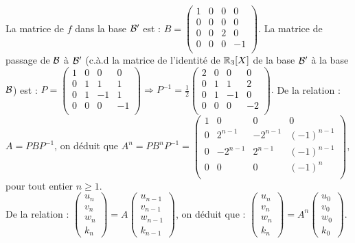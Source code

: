 \begin{question}
\begin{explanations}
\vskip0mm
La matrice de $f$ dans la base ${\cal B}'$ est :
$B= \left(\begin{array}{rccc}
1&0&0&0\\
0&0&0&0\\ 
0&0&2&0\\
0&0&0&-1\\
\end{array}\right)$.
\vskip0mm
La matrice de passage de  ${\cal B}$ à   ${\cal B}'$ (c.à.d la matrice de l'identité de $\mathbb{R}_3[X]$ de 
la base ${\cal B}'$ à la base ${\cal B}$) 
est : $P= \left(\begin{array}{rccc} 1&0&0&0\\
0&1&1&1\\ 
0&1&-1&1\\ 0&0&0&-1\\
\end{array}\right)\Rightarrow \displaystyle P^{-1}= \frac{1}{2}\left(\begin{array}{rccc}
2&0&0&0\\
0&1&1&2\\ 
0&1&-1&0\\
0&0&0&-2\\
\end{array}\right).$ 
\vskip0mm
De la relation : $A=PBP^{-1}$, on déduit que 
$A^n= PB^nP^{-1}=\left(\begin{array}{rccc}
1&0&0&0\\
0 &2^{n-1}&-2^{n-1}&(-1)^{n-1}\\ 
0 &-2^{n-1}&2^{n-1}&(-1)^{n-1}\\ 
0 &0&0&(-1)^n\\ 
\end{array}\right)$, pour tout entier $n\ge 1$.\\
De la relation : $\left(\begin{array}{r}u_n\\v_n\\ w_n\\k_n\end{array}\right) = A  \left(\begin{array}{r}
u_{n-1}\\v_{n-1}\\ w_{n-1}\\k_{n-1}\end{array}\right)$, on déduit que : 
$\left(\begin{array}{r}u_n\\v_n\\ w_n\\k_n\end{array}\right) = A^n \left(\begin{array}{r}u_0\\v_0\\ w_0\\k_0\end{array}\right)$.
\end{explanations}
\end{question}







